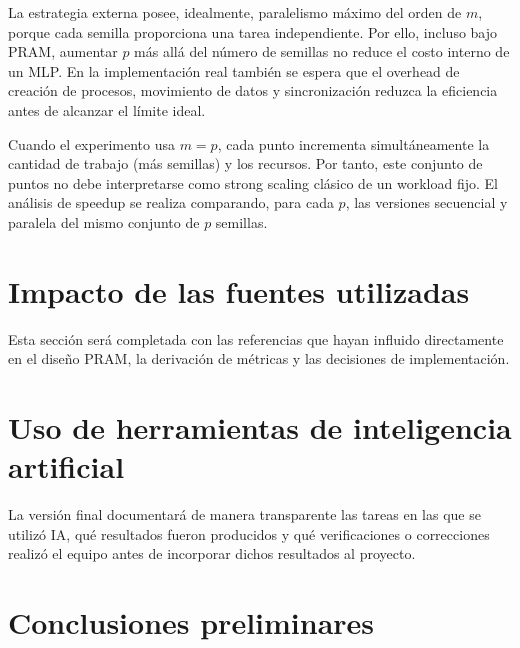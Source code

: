 \documentclass[11pt,a4paper]{article}
\begin{document}
La estrategia externa posee, idealmente, paralelismo máximo del orden de $m$, porque
cada semilla proporciona una tarea independiente. Por ello, incluso bajo PRAM, aumentar
$p$ más allá del número de semillas no reduce el costo interno de un MLP. En la
implementación real también se espera que el overhead de creación de procesos,
movimiento de datos y sincronización reduzca la eficiencia antes de alcanzar el límite
ideal.

Cuando el experimento usa $m=p$, cada punto incrementa simultáneamente la cantidad de
trabajo (más semillas) y los recursos. Por tanto, este conjunto de puntos no debe
interpretarse como strong scaling clásico de un workload fijo. El análisis de speedup se
realiza comparando, para cada $p$, las versiones secuencial y paralela del mismo conjunto
de $p$ semillas.

\section{Impacto de las fuentes utilizadas}


Esta sección será completada con las referencias que hayan influido directamente en el
diseño PRAM, la derivación de métricas y las decisiones de implementación.

\section{Uso de herramientas de inteligencia artificial}

La versión final documentará de manera transparente las tareas en las que se utilizó IA,
qué resultados fueron producidos y qué verificaciones o correcciones realizó el equipo
antes de incorporar dichos resultados al proyecto.

\section{Conclusiones preliminares}
\end{document}
